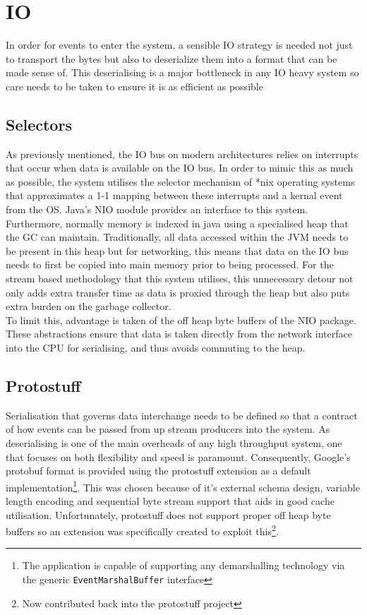 \documentclass[a4paper,11pt]{scrreprt}
\begin{document}
\section{IO}
In order for events to enter the system, a sensible IO strategy is needed not just to transport the bytes but also to deserialize them into a format that can be made sense of. This deserialising is a major bottleneck in any IO heavy system so care needs to be taken to ensure it is as efficient as possible
\subsection{Selectors}
As previously mentioned, the IO bus on modern architectures relies on interrupts that occur when data is available on the IO bus. In order to mimic this as much as possible, the system utilises the selector mechanism of *nix operating systems that approximates a 1-1 mapping between these interrupts and a kernal event from the OS. Java's NIO module provides an interface to this system. Furthermore, normally memory is indexed in java using a specialised heap that the GC can maintain. Traditionally, all data accessed within the JVM needs to be present in this heap but for networking, this means that data on the IO bus needs to first be copied into main memory prior to being processed. For the stream based methodology that this system utilises, this unnecessary detour not only adds extra transfer time as data is proxied through the heap but also puts extra burden on the garbage collector.\\
To limit this, advantage is taken of the off heap byte buffers of the NIO package. These abstractions ensure that data is taken directly from the network interface into the CPU for serialising, and thus avoids commuting to the heap.
\subsection{Protostuff}
Serialisation that governs data interchange needs to be defined so that a contract of how events can be passed from up stream producers into the system. As deserialising is one of the main overheads of any high throughput system, one that focuses on both flexibility and speed is paramount. Consequently, Google's protobuf\cite{googleprotobuf} format is provided using the protostuff extension as a default implementation\footnote{The application is capable of supporting any demarshalling technology via the generic \texttt{EventMarshalBuffer} interface}. This was chosen because of it's external schema design, variable length encoding and sequential byte stream support that aids in good cache utilisation. Unfortunately, protostuff does not support proper off heap byte buffers so an extension was specifically created to exploit this\footnote{Now contributed back into the protostuff project}.
\end{document}
